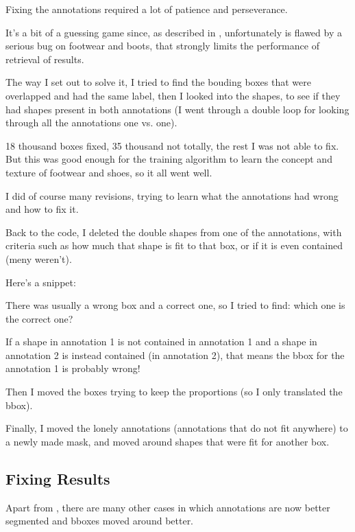 Fixing the annotations required a lot of patience and perseverance.

It's a bit of a guessing game since, as described in , unfortunately \modanet is flawed by a serious bug on footwear and boots, that strongly limits the performance of retrieval of results.

The way I set out to solve it, I tried to find the bouding boxes that were overlapped and had the same label, then I looked into the shapes, to see if they had shapes present in both annotations (I went through a double loop for looking through all the annotations one vs. one).

18 thousand boxes fixed, 35 thousand not totally, the rest I was not able to fix. But this was good enough for the training algorithm to learn the concept and texture of footwear and shoes, so it all went well.

I did of course many revisions, trying to learn what the annotations had wrong and how to fix it.

Back to the code, I deleted the double shapes from one of the annotations, with criteria such as how much that shape is fit to that box, or if it is even contained (meny weren't).

Here's a snippet:



There was usually a wrong box and a correct one, so I tried to find: which one is the correct one?

If a shape in annotation 1 is not contained in annotation 1 and a shape in annotation 2 is instead contained (in annotation 2), that means the bbox for the annotation 1 is probably wrong!

Then I moved the boxes trying to keep the proportions (so I only translated the bbox).

Finally, I moved the lonely annotations (annotations that do not fit anywhere) to a newly made mask, and moved around shapes that were fit for another box.

\subsection{Fixing Results}\label{s:fixing-r}

Apart from , there are many other cases in which annotations are now better segmented and bboxes moved around better.

